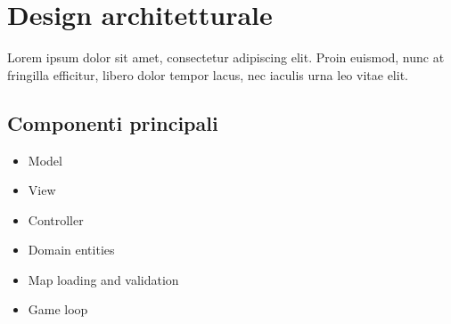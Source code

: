 \chapter{Design architetturale}
Lorem ipsum dolor sit amet, consectetur adipiscing elit. Proin euismod, nunc at
fringilla efficitur, libero dolor tempor lacus, nec iaculis urna leo vitae
elit.

\section{Componenti principali}
\begin{itemize}[leftmargin=*]
  \item Model
  \item View
  \item Controller
  \item Domain entities
  \item Map loading and validation
  \item Game loop
\end{itemize}
